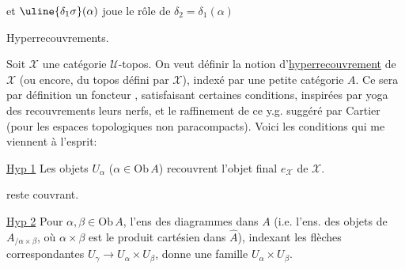 et $\uline{\delta_1\sigma}(\alpha)$ joue le rôle de $\delta_2=\delta_1(\alpha)$


Hyperrecouvrements.

Soit $\mathcal X$ une catégorie $\mathcal U$-topos. On veut définir  la notion d'\uline{hyperrecouvrement} de $\mathcal X$ (ou encore, du topos défini par $\mathcal X$), indexé par une petite catégorie $A$.  Ce sera par définition un foncteur
, satisfaisant certaines conditions, inspirées par  yoga  des recouvrements  leurs nerfs, et le raffinement de ce y.g. suggéré par Cartier (pour les espaces topologiques non paracompacts). Voici les conditions qui me viennent à l'esprit:

\uline{Hyp 1} Les objets $U_\alpha$ ($\alpha\in\mathrm{Ob}\,A$) recouvrent l'objet final $e_{\mathcal X}$ de $\mathcal X$.



reste couvrant.

\uline{Hyp 2} Pour $\alpha,\beta\in\mathrm{Ob}\,A$, l'ens des  diagrammes
\diagram{\begin{tikzcd}[ampersand replacement=\&,column sep=small,row sep=small]\&\alpha\\\gamma\arrow[ur]\arrow[dr]\&\\\&\beta\end{tikzcd}}
dans $A$ (i.e. l'ens. des objets de $A_{/\alpha\times\beta}$, où $\alpha\times\beta$ est le produit cartésien dans $\widehat A$), indexant les flèches correspondantes $U_\gamma\longrightarrow U_\alpha\times U_\beta$, donne une famille  $U_\alpha\times U_\beta$.

